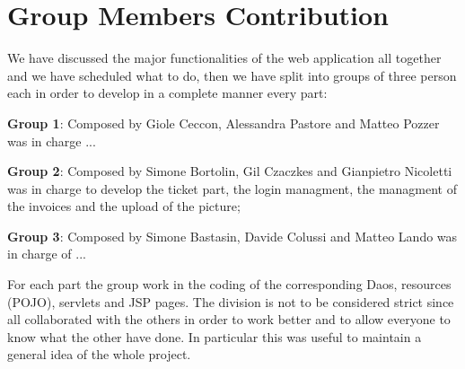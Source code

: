 \section{Group Members Contribution}

We have discussed the major functionalities of the web application all together and we have scheduled what to do,
then we have split into groups of three person each in order to develop in a complete manner every part:


\begin{description}
	\item \textbf{Group 1}: Composed by Giole Ceccon, Alessandra Pastore and Matteo Pozzer was in charge ...
	\item \textbf{Group 2}: Composed by Simone Bortolin, Gil Czaczkes and Gianpietro Nicoletti was in charge to develop the ticket part, the login managment, the managment of the invoices and the upload of the picture;
	\item \textbf{Group 3}: Composed by Simone Bastasin, Davide Colussi and Matteo Lando was in charge of ...

For each part the group work in the coding of the corresponding Daos, resources (POJO), servlets and JSP pages.
The division is not to be considered strict since all collaborated with the others in order to work better and to allow everyone to know what the other have done. In particular this was useful to maintain a general idea of the whole project.

\end{description}